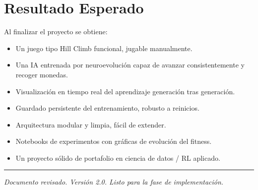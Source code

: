 \documentclass[11pt,a4paper]{article}
\begin{document}
\section{Resultado Esperado}

Al finalizar el proyecto se obtiene:

\begin{itemize}
    \item Un juego tipo Hill Climb funcional, jugable manualmente.
    \item Una IA entrenada por neuroevolución capaz de avanzar consistentemente y recoger monedas.
    \item Visualización en tiempo real del aprendizaje generación tras generación.
    \item Guardado persistente del entrenamiento, robusto a reinicios.
    \item Arquitectura modular y limpia, fácil de extender.
    \item Notebooks de experimentos con gráficas de evolución del fitness.
    \item Un proyecto sólido de portafolio en ciencia de datos / RL aplicado.
\end{itemize}

\vspace{2em}
\hrule
\vspace{0.5em}
\noindent\textit{Documento revisado. Versión 2.0. Listo para la fase de implementación.}
\end{document}
